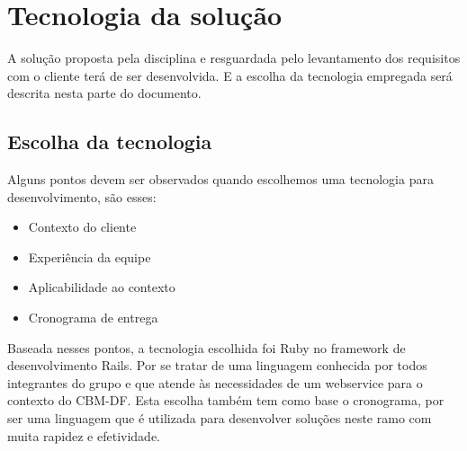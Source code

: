 \chapter[Tecnologia da solução]{Tecnologia da solução}

  A solução proposta pela disciplina e resguardada pelo levantamento dos requisitos com o cliente terá de ser desenvolvida.
  E a escolha da tecnologia empregada será descrita nesta parte do documento.
  
  \section{Escolha da tecnologia}
  
    Alguns pontos devem ser observados quando escolhemos uma tecnologia para desenvolvimento, são esses:
    
    \begin{itemize}
     \item Contexto do cliente
     \item Experiência da equipe
     \item Aplicabilidade ao contexto
     \item Cronograma de entrega
    \end{itemize}
    
    Baseada nesses pontos, a tecnologia escolhida foi Ruby no framework de desenvolvimento Rails. Por se tratar de uma linguagem 
    conhecida por todos integrantes do grupo e que atende às necessidades de um webservice para o contexto do CBM-DF. Esta escolha
    também tem como base o cronograma, por ser uma linguagem que é utilizada para desenvolver soluções neste ramo com muita rapidez
    e efetividade. 
